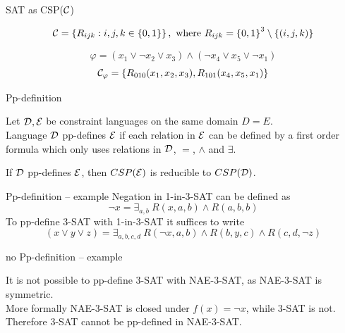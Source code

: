 \documentclass[aspectratio=169]{beamer}
\begin{document}

\begin{frame}{SAT as CSP(\(\mathcal{C}\))}

\[ \mathcal{C} = \left\{ R_{ijk} : i, j, k \in \left\{ 0, 1 \right\} \right\}, \text{ where } R_{ijk} = \left\{ 0, 1 \right\}^3 \setminus \left\{ (i, j, k) \right\} \]

\pause
\vspace{1.5em}
\[ \varphi = (x_1 \lor \neg x_2 \lor x_3) \land (\neg x_4 \lor x_5 \lor \neg x_1) \]
\[ \mathcal{C}_{\varphi} = \left\{ R_{010}(x_1, x_2, x_3), R_{101}(x_4, x_5, x_1) \right\} \]


\end{frame}


\begin{frame}{Pp-definition}

Let \( \mathcal{D}, \mathcal{E} \) be constraint languages on the same domain \( D = E \). \\

\vspace{0.5em}
Language \(\mathcal{D}\) pp-defines \(\mathcal{E}\) if each relation in \(\mathcal{E}\) can be defined by a first order formula which only uses relations in \(\mathcal{D}\), \(=\), \(\land\) and \(\exists\).

\pause
\vspace{2em}
If \(\mathcal{D}\) pp-defines \(\mathcal{E}\), then \(CSP(\mathcal{E})\) is reducible to \(CSP(\mathcal{D})\).

\end{frame}


\begin{frame}{Pp-definition -- example}
Negation in 1-in-3-SAT can be defined as 
\[
    \neg x = \exists_{a,b} \ R(x,a,b) \land R(a,b,b)
\]
\pause
\vspace{1.5em}
To pp-define 3-SAT with 1-in-3-SAT it suffices to write
\vspace{-1em}
\[
    (x \lor y \lor z) = \exists_{a,b,c,d} \ R(\neg x, a, b) \land R(b, y, c) \land R(c, d, \neg z) 
\]

\end{frame}


\begin{frame}{no Pp-definition -- example}

It is not possible to pp-define 3-SAT with NAE-3-SAT, as NAE-3-SAT is symmetric.\\
\pause
\vspace{1em}
More formally NAE-3-SAT is closed under \(f(x)=\neg x\), while 3-SAT is not. Therefore 3-SAT cannot be pp-defined in NAE-3-SAT.

\end{frame}
\end{document}
